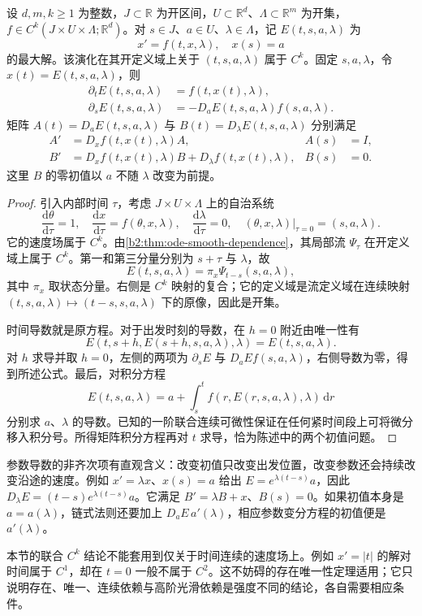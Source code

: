 \begin{proposition}[带参数的非自治演化]\label{b2:prop:ode-parameter-variation}
设 \(d,m,k\geq1\) 为整数，\(J\subset\mathbb R\) 为开区间，\(U\subset\mathbb R^d\)、\(\Lambda\subset\mathbb R^m\) 为开集，\(f\in C^k(J\times U\times\Lambda;\mathbb R^d)\)。对 \(s\in J\)、\(a\in U\)、\(\lambda\in\Lambda\)，记 \(E(t,s,a,\lambda)\) 为
\[
 x'=f(t,x,\lambda),\quad x(s)=a
\]
的最大解。该演化在其开定义域上关于 \((t,s,a,\lambda)\) 属于 \(C^k\)。固定 \(s,a,\lambda\)，令 \(x(t)=E(t,s,a,\lambda)\)，则
\begin{align*}
 \partial_tE(t,s,a,\lambda)&=f(t,x(t),\lambda),\\
 \partial_sE(t,s,a,\lambda)&=-D_aE(t,s,a,\lambda)f(s,a,\lambda).
\end{align*}
矩阵 \(A(t)=D_aE(t,s,a,\lambda)\) 与 \(B(t)=D_\lambda E(t,s,a,\lambda)\) 分别满足
\begin{align*}
 A'&=D_xf(t,x(t),\lambda)A,& A(s)&=I,\\
 B'&=D_xf(t,x(t),\lambda)B+D_\lambda f(t,x(t),\lambda),& B(s)&=0.
\end{align*}
这里 \(B\) 的零初值以 \(a\) 不随 \(\lambda\) 改变为前提。
\end{proposition}
\begin{proof}
引入内部时间 \(\tau\)，考虑 \(J\times U\times\Lambda\) 上的自治系统
\[
 \frac{\mathrm d\theta}{\mathrm d\tau}=1,\quad
 \frac{\mathrm dx}{\mathrm d\tau}=f(\theta,x,\lambda),\quad
 \frac{\mathrm d\lambda}{\mathrm d\tau}=0,
 \quad (\theta,x,\lambda)|_{\tau=0}=(s,a,\lambda).
\]
它的速度场属于 \(C^k\)。由\cref{b2:thm:ode-smooth-dependence}，其局部流 \(\Psi_\tau\) 在开定义域上属于 \(C^k\)。第一和第三分量分别为 \(s+\tau\) 与 \(\lambda\)，故
\[
 E(t,s,a,\lambda)=\pi_x\Psi_{t-s}(s,a,\lambda),
\]
其中 \(\pi_x\) 取状态分量。右侧是 \(C^k\) 映射的复合；它的定义域是流定义域在连续映射 \((t,s,a,\lambda)\mapsto(t-s,s,a,\lambda)\) 下的原像，因此是开集。

时间导数就是原方程。对于出发时刻的导数，在 \(h=0\) 附近由唯一性有
\[
 E(t,s+h,E(s+h,s,a,\lambda),\lambda)=E(t,s,a,\lambda).
\]
对 \(h\) 求导并取 \(h=0\)，左侧的两项为 \(\partial_sE\) 与 \(D_aE f(s,a,\lambda)\)，右侧导数为零，得到所述公式。最后，对积分方程
\[
 E(t,s,a,\lambda)=a+\int_s^t f(r,E(r,s,a,\lambda),\lambda)\,\mathrm dr
\]
分别求 \(a\)、\(\lambda\) 的导数。已知的一阶联合连续可微性保证在任何紧时间段上可将微分移入积分号。所得矩阵积分方程再对 \(t\) 求导，恰为陈述中的两个初值问题。
\end{proof}

参数导数的非齐次项有直观含义：改变初值只改变出发位置，改变参数还会持续改变沿途的速度。例如 \(x'=\lambda x\)、\(x(s)=a\) 给出 \(E=e^{\lambda(t-s)}a\)，因此 \(D_\lambda E=(t-s)e^{\lambda(t-s)}a\)。它满足 \(B'=\lambda B+x\)、\(B(s)=0\)。如果初值本身是 \(a=a(\lambda)\)，链式法则还要加上 \(D_aE\,a'(\lambda)\)，相应参数变分方程的初值便是 \(a'(\lambda)\)。

\ProseParagraphBreak

本节的联合 \(C^k\) 结论不能套用到仅关于时间连续的速度场上。例如 \(x'=|t|\) 的解对时间属于 \(C^1\)，却在 \(t=0\) 一般不属于 \(C^2\)。这不妨碍的存在唯一性定理适用；它只说明存在、唯一、连续依赖与高阶光滑依赖是强度不同的结论，各自需要相应条件。
